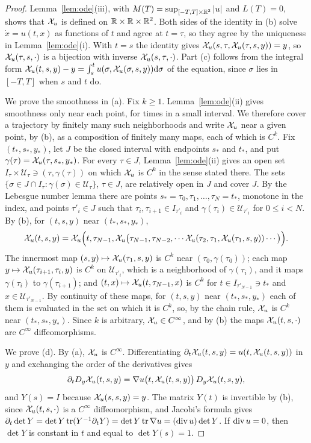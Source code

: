 \begin{proof}
Lemma~\ref{lem:ode}(iii), with $M(T)=\sup_{[-T,T]\times\mathbb{R}^2}|u|$ and $L(T)=0$,
shows that $\mathcal{X}_u$ is defined on $\mathbb{R}\times\mathbb{R}\times\mathbb{R}^2$. Both sides of the
identity in (b) solve $\dot x=u(t,x)$ as functions of $t$ and agree at $t=\tau$,
so they agree by the uniqueness in Lemma~\ref{lem:ode}(i). With $t=s$ the
identity gives $\mathcal{X}_u(s,\tau,\mathcal{X}_u(\tau,s,y))=y$, so $\mathcal{X}_u(\tau,s,\cdot)$ is
a bijection with inverse $\mathcal{X}_u(s,\tau,\cdot)$. Part (c) follows from the
integral form
$\mathcal{X}_u(t,s,y)-y=\int_s^tu(\sigma,\mathcal{X}_u(\sigma,s,y))\dd\sigma$ of the
equation, since $\sigma$ lies in $[-T,T]$ when $s$ and $t$ do.

We prove the smoothness in (a). Fix $k\ge1$. Lemma~\ref{lem:ode}(ii) gives smoothness only
near each point, for times in a small interval. We therefore cover a trajectory
by finitely many such neighborhoods and write $\mathcal{X}_u$ near a given point, by
(b), as a composition of finitely many maps, each of which is $C^k$.
Fix $(t_*,s_*,y_*)$, let $J$ be the
closed interval with endpoints $s_*$ and $t_*$, and put
$\gamma(\tau)=\mathcal{X}_u(\tau,s_*,y_*)$. For every $\tau\in J$,
Lemma~\ref{lem:ode}(ii) gives an open set
$I_\tau\times\mathcal U_\tau\ni(\tau,\gamma(\tau))$ on which $\mathcal{X}_u$ is $C^k$ in
the sense stated there. The sets
$\{\sigma\in J\cap I_\tau:\gamma(\sigma)\in\mathcal U_\tau\}$, $\tau\in J$, are
relatively open in $J$ and cover $J$. By the Lebesgue number lemma there are
points $s_*=\tau_0,\tau_1,\dots,\tau_N=t_*$, monotone in the index, and points
$\tau'_i\in J$ such that $\tau_i,\tau_{i+1}\in I_{\tau'_i}$ and
$\gamma(\tau_i)\in\mathcal U_{\tau'_i}$ for $0\le i<N$. By (b), for $(t,s,y)$ near $(t_*,s_*,y_*)$,
\[
\mathcal{X}_u(t,s,y)=\mathcal{X}_u\Big(t,\tau_{N-1},\mathcal{X}_u\big(\tau_{N-1},\tau_{N-2},\cdots
\mathcal{X}_u(\tau_2,\tau_1,\mathcal{X}_u(\tau_1,s,y))\cdots\big)\Big).
\]
The innermost map $(s,y)\mapsto\mathcal{X}_u(\tau_1,s,y)$ is $C^k$ near
$(\tau_0,\gamma(\tau_0))$; each map $y\mapsto\mathcal{X}_u(\tau_{i+1},\tau_i,y)$ is $C^k$
on $\mathcal U_{\tau'_i}$, which is a neighborhood of $\gamma(\tau_i)$, and it
maps $\gamma(\tau_i)$ to $\gamma(\tau_{i+1})$; and
$(t,x)\mapsto\mathcal{X}_u(t,\tau_{N-1},x)$ is $C^k$ for $t\in I_{\tau'_{N-1}}\ni t_*$
and $x\in\mathcal U_{\tau'_{N-1}}$. By
continuity of these maps, for $(t,s,y)$ near $(t_*,s_*,y_*)$ each of them is
evaluated in the set on which it is $C^k$, so, by the chain rule, $\mathcal{X}_u$ is $C^k$ near $(t_*,s_*,y_*)$. Since $k$
is arbitrary, $\mathcal{X}_u\in C^\infty$, and by (b) the maps $\mathcal{X}_u(t,s,\cdot)$ are
$C^\infty$ diffeomorphisms.

We prove (d). By (a), $\mathcal{X}_u$ is $C^\infty$. Differentiating
$\partial_t\mathcal{X}_u(t,s,y)=u(t,\mathcal{X}_u(t,s,y))$ in $y$ and exchanging the order
of the derivatives gives
\[
\partial_tD_y\mathcal{X}_u(t,s,y)=\nabla u\big(t,\mathcal{X}_u(t,s,y)\big)\,D_y\mathcal{X}_u(t,s,y),
\]
and $Y(s)=I$ because $\mathcal{X}_u(s,s,y)=y$. The matrix
$Y(t)$ is invertible by (b), since $\mathcal{X}_u(t,s,\cdot)$ is a $C^\infty$
diffeomorphism, and Jacobi's formula gives
$\partial_t\det Y=\det Y\operatorname{tr}(Y^{-1}\partial_tY)=\det
Y\operatorname{tr}\nabla u=(\operatorname{div} u)\det Y$. If $\operatorname{div} u=0$, then $\det Y$ is
constant in $t$ and equal to $\det Y(s)=1$.
\end{proof}

